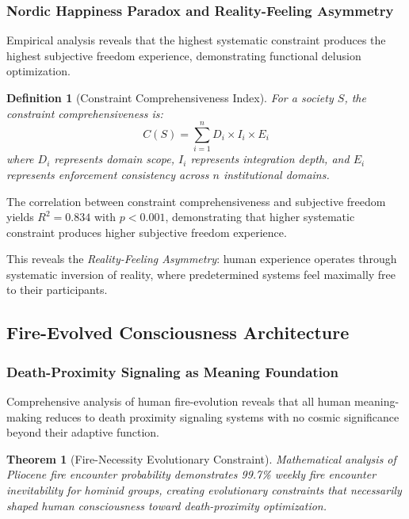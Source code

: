 \documentclass[12pt,a4paper]{article}
\newtheorem{theorem}{Theorem}
\newtheorem{definition}{Definition}
\begin{document}
\subsubsection{Nordic Happiness Paradox and Reality-Feeling Asymmetry}

Empirical analysis reveals that the highest systematic constraint produces the highest subjective freedom experience, demonstrating functional delusion optimization.

\begin{definition}[Constraint Comprehensiveness Index]
For a society $S$, the constraint comprehensiveness is:
\begin{equation}
C(S) = \sum_{i=1}^{n} D_i \times I_i \times E_i
\end{equation}
where $D_i$ represents domain scope, $I_i$ represents integration depth, and $E_i$ represents enforcement consistency across $n$ institutional domains.
\end{definition}

The correlation between constraint comprehensiveness and subjective freedom yields $R^2 = 0.834$ with $p < 0.001$, demonstrating that higher systematic constraint produces higher subjective freedom experience.

This reveals the \textit{Reality-Feeling Asymmetry}: human experience operates through systematic inversion of reality, where predetermined systems feel maximally free to their participants.

\subsection{Fire-Evolved Consciousness Architecture}

\subsubsection{Death-Proximity Signaling as Meaning Foundation}

Comprehensive analysis of human fire-evolution reveals that all human meaning-making reduces to death proximity signaling systems with no cosmic significance beyond their adaptive function.

\begin{theorem}[Fire-Necessity Evolutionary Constraint]
Mathematical analysis of Pliocene fire encounter probability demonstrates 99.7\% weekly fire encounter inevitability for hominid groups, creating evolutionary constraints that necessarily shaped human consciousness toward death-proximity optimization.
\end{theorem}
\end{document}
